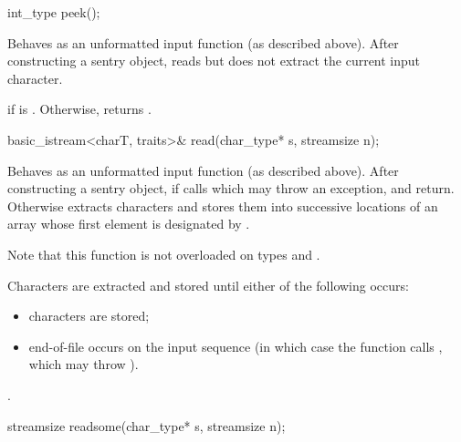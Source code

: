 %
\begin{itemdecl}
int_type peek();
\end{itemdecl}

\begin{itemdescr}
\pnum
\effects
Behaves as an unformatted input function
(as described above).
After constructing a sentry object, reads but does not extract
the current input character.

\pnum
\returns
{}
if
is
.
Otherwise, returns
.
\end{itemdescr}

%
\begin{itemdecl}
basic_istream<charT, traits>& read(char_type* s, streamsize n);
\end{itemdecl}

\begin{itemdescr}
\pnum
\effects
Behaves as an unformatted input function (as described above).
After constructing
a sentry object, if
calls
which may throw an exception,
and return.
Otherwise extracts characters and stores them
into successive locations of an array whose first element is designated by
.
\begin{footnote}
Note that this function is not overloaded on types
and
.
\end{footnote}
Characters are extracted and stored until either of the following occurs:
\begin{itemize}
\item
{} characters are stored;
\item
end-of-file occurs on the input sequence
(in which case the function calls
,
which may throw
).
\end{itemize}

\pnum
\returns
{}.
\end{itemdescr}

%
\begin{itemdecl}
streamsize readsome(char_type* s, streamsize n);
\end{itemdecl}

